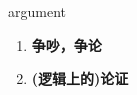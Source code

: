 
\begin{frame}
{\huge argument}
\begin{center}
\begin{enumerate}\Large
  \item \textbf{争吵，争论}
  \item \textbf{(逻辑上的)论证}
\end{enumerate}
\end{center}
\end{frame}
